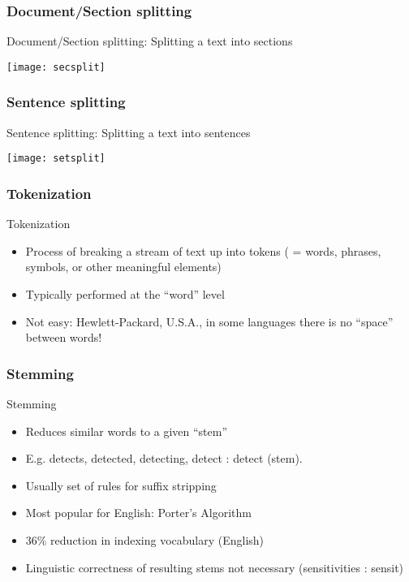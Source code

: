 \begin{frame}[fragile]\frametitle{Document/Section splitting}
Document/Section splitting: Splitting a text into sections
\begin{center}
\texttt{[image: secsplit]}
\end{center}
\end{frame}


\begin{frame}[fragile]\frametitle{Sentence splitting}
Sentence splitting: Splitting a text into sentences
\begin{center}
\texttt{[image: setsplit]}
\end{center}
\end{frame}

\begin{frame}[fragile]\frametitle{Tokenization}
Tokenization
		\begin{itemize}
		\item  Process of breaking a stream of text up into tokens ( = words, phrases, symbols, or other meaningful elements)
		\item  Typically performed at the ``word'' level
		\item  Not easy: Hewlett-Packard, U.S.A., in some languages there is no ``space'' between words!
		\end{itemize}
\end{frame}

\begin{frame}[fragile]\frametitle{Stemming}
Stemming
		\begin{itemize}
		\item  Reduces similar words to a given ``stem''
    \item E.g. detects, detected, detecting, detect : detect (stem).
    \item Usually set of rules for suffix stripping 
    \item Most popular for English: Porter's Algorithm 
    \item 36\% reduction in indexing vocabulary (English)
    \item Linguistic correctness of resulting stems not necessary (sensitivities : sensit)
		\end{itemize}
\end{frame}

